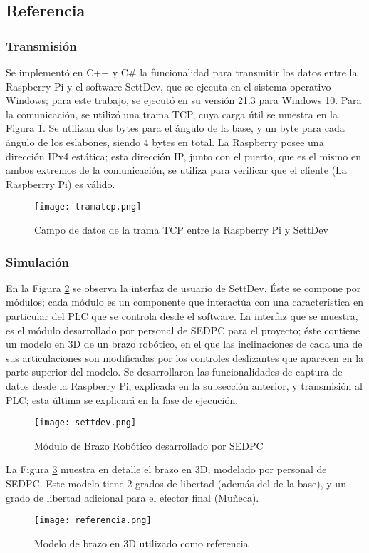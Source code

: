 \subsection{Referencia}

\subsubsection{Transmisión}

Se implementó en C++ y C\# la funcionalidad para transmitir los datos entre la Raspberry Pi y el software SettDev, que se ejecuta en el sistema operativo Windows; para este trabajo, se ejecutó en su versión 21.3 para Windows 10. Para la comunicación, se utilizó una trama TCP, cuya carga útil se muestra en la Figura \ref{fig:tramatcp}. Se utilizan dos bytes para el ángulo de la base, y un byte para cada ángulo de los eslabones, siendo 4 bytes en total. La Raspberry posee una dirección IPv4 estática; esta dirección IP, junto con el puerto, que es el mismo en ambos extremos de la comunicación, se utiliza para verificar que el cliente (La Raspberrry Pi) es válido.

\begin{figure}[htb]
	\centering
	\texttt{[image: tramatcp.png]}
	\caption{Campo de datos de la trama TCP entre la Raspberry Pi y SettDev}
	\label{fig:tramatcp}
\end{figure}

\subsubsection{Simulación}

En la Figura \ref{fig:settdev} se observa la interfaz de usuario de SettDev. Éste se compone por módulos; cada módulo es un componente que interactúa con una característica en particular del PLC que se controla desde el software. La interfaz que se muestra, es el módulo desarrollado por personal de SEDPC para el proyecto; éste contiene un modelo en 3D de un brazo robótico, en el que las inclinaciones de cada una de sus articulaciones son modificadas por los controles deslizantes que aparecen en la parte superior del modelo. Se desarrollaron las funcionalidades de captura de datos desde la Raspberry Pi, explicada en la subsección anterior, y transmisión al PLC; esta última se explicará en la fase de ejecución.

\begin{figure}[htb]
	\centering
	\texttt{[image: settdev.png]}
	\caption{Módulo de Brazo Robótico desarrollado por SEDPC}
	\label{fig:settdev}
\end{figure}

\newpage
La Figura \ref{fig:referencia} muestra en detalle el brazo en 3D, modelado por personal de SEDPC. Este modelo tiene 2 grados de libertad (además del de la base), y un grado de libertad adicional para el efector final (Muñeca).

\begin{figure}[htb]
	\centering
	\texttt{[image: referencia.png]}
	\caption{Modelo de brazo en 3D utilizado como referencia}
	\label{fig:referencia}
\end{figure}
\newpage